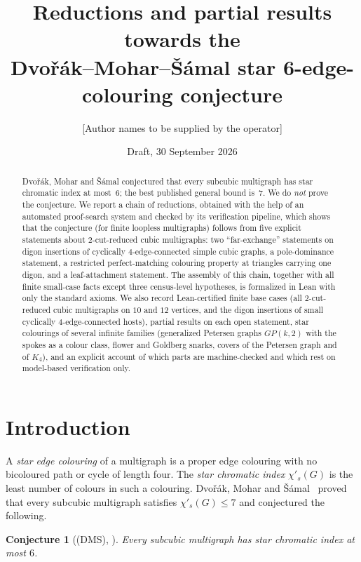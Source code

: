 \documentclass[11pt]{amsart}
\title[Partial results on the star 6-edge-colouring conjecture]{Reductions and partial results towards the\\ Dvo\v{r}\'ak--Mohar--\v{S}\'amal star 6-edge-colouring conjecture}
\author{[Author names to be supplied by the operator]}
\date{Draft, 30 September 2026}
\newtheorem*{conjecture}{Conjecture}
\theoremstyle{definition}
\theoremstyle{remark}
\newcommand{\chis}{\chi'_{s}}
\newcommand{\hyp}[1]{\textup{(#1)}}
\newcommand{\Lean}{\textsf{Lean}}
\begin{document}
\begin{abstract}
Dvo\v{r}\'ak, Mohar and \v{S}\'amal conjectured that every subcubic multigraph has star chromatic index at most~$6$; the best published general bound is~$7$. We do \emph{not} prove the conjecture. We report a chain of reductions, obtained with the help of an automated proof-search system and checked by its verification pipeline, which shows that the conjecture (for finite loopless multigraphs) follows from five explicit statements about $2$-cut-reduced cubic multigraphs: two ``far-exchange'' statements on digon insertions of cyclically $4$-edge-connected simple cubic graphs, a pole-dominance statement, a restricted perfect-matching colouring property at triangles carrying one digon, and a leaf-attachment statement. The assembly of this chain, together with all finite small-case facts except three census-level hypotheses, is formalized in \Lean{} with only the standard axioms. We also record Lean-certified finite base cases (all $2$-cut-reduced cubic multigraphs on $10$ and $12$ vertices, and the digon insertions of small cyclically $4$-edge-connected hosts), partial results on each open statement, star colourings of several infinite families (generalized Petersen graphs $GP(k,2)$ with the spokes as a colour class, flower and Goldberg snarks, covers of the Petersen graph and of $K_4$), and an explicit account of which parts are machine-checked and which rest on model-based verification only.
\end{abstract}

\maketitle

\section{Introduction}\label{sec:intro}

A \emph{star edge colouring} of a multigraph is a proper edge colouring with no bicoloured path or cycle of length four. The \emph{star chromatic index} $\chis(G)$ is the least number of colours in such a colouring. Dvo\v{r}\'ak, Mohar and \v{S}\'amal~\cite{DMS13} proved that every subcubic multigraph satisfies $\chis(G)\le 7$ and conjectured the following.

\begin{conjecture}[\hyp{DMS}, \cite{DMS13}]
Every subcubic multigraph has star chromatic index at most $6$.
\end{conjecture}
\end{document}
